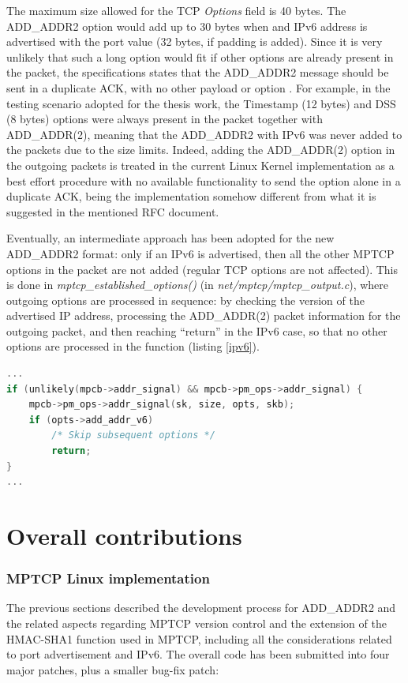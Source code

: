 The maximum size allowed for the TCP \textit{Options} field is 40 bytes. The ADD\_ADDR2 option would add up to 30 bytes when and IPv6 address is advertised with the port value (32 bytes, if padding is added). Since it is very unlikely that such a long option would fit if other options are already present in the packet, the specifications states that the ADD\_ADDR2 message should be sent in a duplicate ACK, with no other payload or option \cite{rfc6824bis05}.
For example, in the testing scenario adopted for the thesis work, the Timestamp (12 bytes) and DSS (8 bytes) options were always present in the packet together with ADD\_ADDR(2), meaning that the ADD\_ADDR2 with IPv6 was never added to the packets due to the size limits. Indeed, adding the ADD\_ADDR(2) option in the outgoing packets is treated in the current Linux Kernel implementation as a best effort procedure with no available functionality to send the option alone in a duplicate ACK, being the implementation somehow different from what it is suggested in the mentioned RFC document.

Eventually, an intermediate approach has been adopted for the new ADD\_ADDR2 format: only if an IPv6 is advertised, then all the other MPTCP options in the packet are not added (regular TCP options are not affected). This is done in \textit{mptcp\_established\_options()} (in \textit{ net/mptcp/mptcp\_output.c}), where outgoing options are processed in sequence: by checking the version of the advertised IP address, processing the ADD\_ADDR(2) packet information for the outgoing packet, and then reaching ``return'' in the IPv6 case, so that no other options are processed in the function (listing \ref{ipv6}).

\begin{lstlisting}[language=c, caption=Other MPTCP options are not added to the outgoing packet if ADD\_ADDR2 is present (IPv6 case only), label=ipv6]
...
if (unlikely(mpcb->addr_signal) && mpcb->pm_ops->addr_signal) {
	mpcb->pm_ops->addr_signal(sk, size, opts, skb);
	if (opts->add_addr_v6)
		/* Skip subsequent options */
		return;
}
...
\end{lstlisting}


\section{Overall contributions}
\label{otherc}

\subsubsection{MPTCP Linux implementation}
The previous sections described the development process for ADD\_ADDR2 and the related aspects regarding MPTCP version control and the extension of the HMAC-SHA1 function used in MPTCP, including all the considerations related to port advertisement and IPv6.
The overall code has been submitted into four major patches, plus a smaller bug-fix patch:

